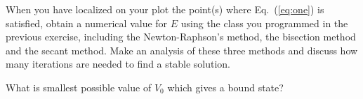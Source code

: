 \begin{prob}
When you have localized on your plot the point(s) where Eq.\ (\ref{eq:one}) 
is satisfied, obtain a numerical value for $E$ using the class you programmed in the 
previous exercise, including the 
Newton-Raphson's method, the bisection method and the secant method.
Make an analysis of these three methods and discuss how many iterations
are needed to find a stable solution.

What is smallest possible value of $V_0$ which  gives a bound state? 
\end{prob}







